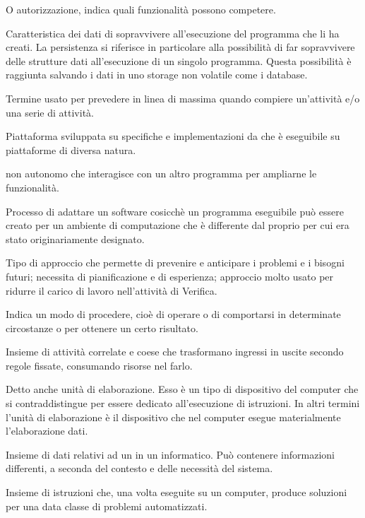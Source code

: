 {O autorizzazione, indica quali funzionalità possono competere.}

{Caratteristica dei dati di sopravvivere all'esecuzione del programma che li ha creati. La persistenza si riferisce in particolare alla possibilità di far sopravvivere delle strutture dati all'esecuzione di un singolo programma. Questa possibilità è raggiunta salvando i dati in uno storage non volatile come i database.}

{Termine usato per prevedere in linea di massima quando compiere un'attività e/o una serie di attività.}

{Piattaforma  sviluppata su specifiche e implementazioni da  che è eseguibile su piattaforme  di diversa natura.}

{ non autonomo che interagisce con un altro programma per ampliarne le funzionalità.}

{Processo di adattare un software cosicchè un programma eseguibile può essere creato per un ambiente di computazione che è differente dal proprio per cui era stato originariamente designato.}

{Tipo di approccio che permette di prevenire e anticipare i problemi e i bisogni futuri; necessita di pianificazione e di esperienza; approccio molto usato per ridurre il carico di lavoro nell'attività di Verifica.}

{Indica un modo di procedere, cioè di operare o di comportarsi in determinate circostanze o per ottenere un certo risultato.}

{Insieme di attività correlate e coese che trasformano ingressi in uscite secondo regole fissate, consumando risorse nel farlo.}

{Detto anche unità di elaborazione. Esso è un tipo di dispositivo  del computer che si contraddistingue per essere dedicato all'esecuzione di istruzioni. In altri termini l'unità di elaborazione è il dispositivo che nel computer esegue materialmente l'elaborazione dati.}

{Insieme di dati relativi ad un  in un  informatico. Può contenere informazioni differenti, a seconda del contesto e delle necessità del sistema.}

{Insieme di istruzioni che, una volta eseguite su un computer, produce soluzioni per una data classe di problemi automatizzati.}

